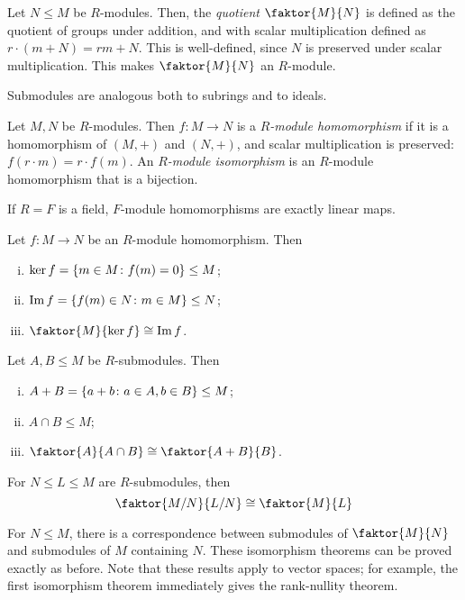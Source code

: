 \begin{definition}
	Let \( N \leq M \) be \( R \)-modules.
	Then, the \textit{quotient} \( \faktor{M}{N} \) is defined as the quotient of groups under addition, and with scalar multiplication defined as \( r \cdot (m + N) = rm + N \).
	This is well-defined, since \( N \) is preserved under scalar multiplication.
	This makes \( \faktor{M}{N} \) an \( R \)-module.
\end{definition}
\begin{remark}
	Submodules are analogous both to subrings and to ideals.
\end{remark}
\begin{definition}
	Let \( M, N \) be \( R \)-modules.
	Then \( f \colon M \to N \) is a \textit{\( R \)-module homomorphism} if it is a homomorphism of \( (M, +) \) and \( (N, +) \), and scalar multiplication is preserved: \( f(r \cdot m) = r \cdot f(m) \).
	An \textit{\( R \)-module isomorphism} is an \( R \)-module homomorphism that is a bijection.
\end{definition}
\begin{example}
	If \( R = F \) is a field, \( F \)-module homomorphisms are exactly linear maps.
\end{example}
\begin{theorem}
	Let \( f \colon M \to N \) be an \( R \)-module homomorphism.
	Then
	\begin{enumerate}[(i)]
		\item \( \ker f = \qty{m \in M \colon f(m) = 0} \leq M \);
		\item \( \Im f = \qty{f(m) \in N \colon m \in M} \leq N \);
		\item \( \faktor{M}{\ker f} \cong \Im f \).
	\end{enumerate}
\end{theorem}
\begin{theorem}
	Let \( A, B \leq M \) be \( R \)-submodules.
	Then
	\begin{enumerate}[(i)]
		\item \( A + B = \qty{a + b \colon a \in A, b \in B} \leq M \);
		\item \( A \cap B \leq M \);
		\item \( \faktor{A}{A \cap B} \cong \faktor{A + B}{B} \).
	\end{enumerate}
\end{theorem}
\begin{theorem}
	For \( N \leq L \leq M \) are \( R \)-submodules, then
	\[ \faktor{M/N}{L/N} \cong \faktor{M}{L} \]
\end{theorem}
For \( N \leq M \), there is a correspondence between submodules of \( \faktor{M}{N} \) and submodules of \( M \) containing \( N \).
These isomorphism theorems can be proved exactly as before.
Note that these results apply to vector spaces; for example, the first isomorphism theorem immediately gives the rank-nullity theorem.

